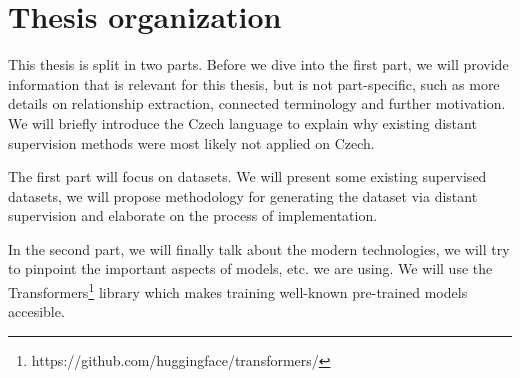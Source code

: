 \section{Thesis organization}
This thesis is split in two parts. Before we dive into the first part, we will provide information that is relevant for this thesis, but is not part-specific, such as more details on relationship extraction, connected terminology and further motivation. We will briefly introduce the Czech language to explain why existing distant supervision methods were most likely not applied on Czech. 

The first part will focus on datasets. We will present some existing supervised datasets, we will propose methodology for generating the dataset via distant supervision and elaborate on the process of implementation.   

In the second part, we will finally talk about the modern technologies, we will try to pinpoint the important aspects of models, etc. we are using. We will use the Transformers\footnote{https://github.com/huggingface/transformers/} library which makes training well-known pre-trained models accesible. 